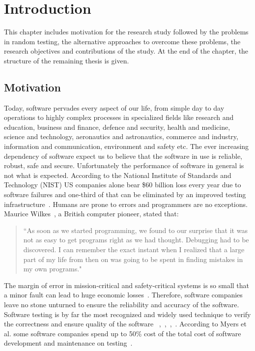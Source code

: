 \chapter{Introduction}

This chapter includes motivation for the research study followed by the problems in random testing, the alternative approaches to overcome these problems, the research objectives and contributions of the study. At the end of the chapter, the structure of the remaining thesis is given.

\section{Motivation}
Today, software pervades every aspect of our life, from simple day to day operations to highly complex processes in specialized fields like research and education, business and finance, defence and security, health and medicine, science and technology, aeronautics and astronautics, commerce and industry, information and communication, environment and safety etc. The ever increasing dependency of software expect us to believe that the software in use is reliable, robust, safe and secure. Unfortunately the performance of software in general is not what is expected. According to the National Institute of Standards and Technology (NIST) US companies alone bear \$60 billion loss every year due to software failures and one-third of that can be eliminated by an improved testing infrastructure~\cite{Standards2002}. Humans are prone to errors and programmers are no exceptions. Maurice Wilkes~\cite{Maurice1985}, a British computer pioneer, stated that:
\begin{quote}
``As soon as we started programming, we found to our surprise that it was not as easy to get programs right as we had thought. Debugging had to be discovered. I can remember the exact instant when I realized that a large part of my life from then on was going to be spent in finding mistakes in my own programs."
\end{quote}

\noindent The margin of error in mission-critical and safety-critical systems is so small that a minor fault can lead to huge economic losses~\cite{huang2004securing}. Therefore, software companies leave no stone unturned to ensure the reliability and accuracy of the software. Software testing is by far the most recognized and widely used technique to verify the correctness and ensure quality of the software ~\cite{Myers2011},~\cite{young2008software},~\cite{patton2001software},~\cite{Standards2002}.  According to Myers et al. some software companies spend up to 50\% cost of the total cost of software development and maintenance on testing~\cite{Myers2011}. 

